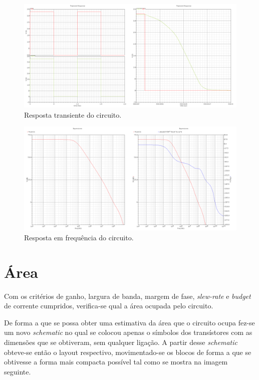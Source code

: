 \documentclass[11pt]{article}
\numberwithin{equation}{section}
\begin{document}
\begin{figure}[H]
	\centering
	\includegraphics[keepaspectratio=true, scale=0.25]{exps/snapshotDc_Slewrate}
	\vspace{-0.5em}
	\caption{Resposta transiente do circuito.}
	\vspace{-0.8em}
\end{figure} 

\begin{figure}[H]
	\centering
	\includegraphics[keepaspectratio=true, scale=0.25]{exps/snapshotAC_Final}
	\vspace{-0.5em}
	\caption{Resposta em frequência do circuito.}
	\vspace{-0.8em}
\end{figure} 

\pagebreak

\section{Área}

Com os critérios de ganho, largura de banda, margem de fase, \textit{slew-rate} e \textit{budget} de corrente cumpridos, verifica-se qual a área ocupada pelo circuito.

De forma a que se possa obter uma estimativa da área que o circuito ocupa fez-se um novo \textit{schematic} no qual se colocou apenas o símbolos dos transístores com as dimensões que se obtiveram, sem qualquer ligação. A partir desse \textit{schematic} obteve-se então o layout respectivo, movimentado-se os blocos de forma a que se obtivesse a forma mais compacta possível tal como se mostra na imagem seguinte.
\end{document}
